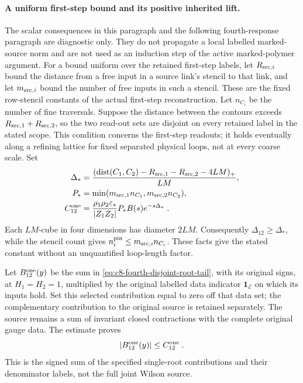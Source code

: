 \documentclass[11pt]{article}
\begin{document}
\paragraph{A uniform first-step bound and its positive inherited lift.}
The scalar consequences in this paragraph and the following
fourth-response paragraph are diagnostic only. They do not
propagate a local labelled marked-source norm and are not
used as an induction step of the active marked-polymer argument.
For a bound uniform over the retained first-step labels, let
$R_{{\rm src},i}$ bound the distance from a free input in a
source link's stencil to that link, and let $m_{{\rm src},i}$
bound the number of free inputs in such a stencil. These are
the fixed row-stencil constants of the actual first-step
reconstruction. Let $n_{C_i}$ be the number of fine traversals.
Suppose the distance between the contours exceeds
$R_{{\rm src},1}+R_{{\rm src},2}$, so the two read-out sets
are disjoint on every retained label in the stated scope.
This condition concerns the first-step readouts; it holds
eventually along a refining lattice for fixed separated
physical loops, not at every coarse scale.
Set
\begin{equation}\label{eq:c8-fourth-uniform-disjoint-constant}
    \begin{aligned}
        \Delta_*&=
            \frac{(\operatorname{dist}(C_1,C_2)
                -R_{{\rm src},1}-R_{{\rm src},2}-4LM)_+}{LM},\\
        P_*&=\min(m_{{\rm src},1}n_{C_1},
                    m_{{\rm src},2}n_{C_2}),\\
        C_{12}^{\rm one}
            &=\frac{\rho_1\rho_2\varepsilon_*}{|Z_1Z_2|}
                P_*B(s)e^{-s\Delta_*}\;.
    \end{aligned}
\end{equation}
Each $LM$-cube in four dimensions has diameter $2LM$.
Consequently $\Delta_{12}\geq\Delta_*$, while the stencil
count gives $n_i^{\rm pin}\leq m_{{\rm src},i}n_{C_i}$.
These facts give the stated constant without an unquantified
loop-length factor.

Let $B_{12}^{\rm one}(y)$ be the sum in
\eqref{eq:c8-fourth-disjoint-root-tail}, with its original
signs, at $H_1=H_2=1$, multiplied by the original labelled
data indicator $\mathbf 1_{\mathscr E}$ on which its inputs
hold. Set this selected contribution equal to zero off that
data set; the complementary contribution to the original
source is retained separately. The source remains a sum
of invariant closed contractions with the complete original
gauge data. The estimate proves
\begin{equation}\label{eq:c8-fourth-initial-connecting-source}
    |B_{12}^{\rm one}(y)|\leq C_{12}^{\rm one}\;.
\end{equation}
This is the signed sum of the specified single-root
contributions and their denominator labels, not the full
joint Wilson source.
\end{document}
